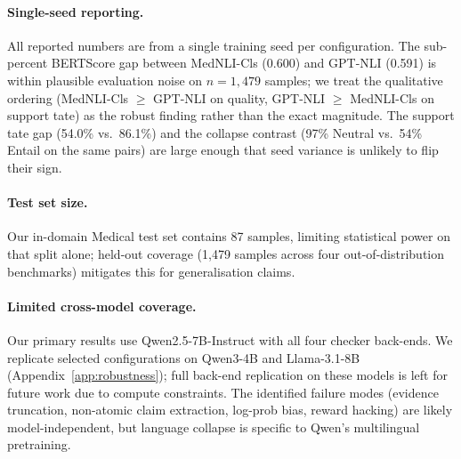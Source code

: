 \documentclass[11pt]{article}
\begin{document}
\paragraph{Single-seed reporting.}
All reported numbers are from a single training seed 
per configuration. The sub-percent BERTScore gap 
between MedNLI-Cls (0.600) and GPT-NLI (0.591) is 
within plausible evaluation noise on $n{=}1{,}479$ 
samples; we treat the qualitative ordering 
(MedNLI-Cls $\geq$ GPT-NLI on quality, 
GPT-NLI $\geq$ MedNLI-Cls on support tate) as the 
robust finding rather than the exact magnitude. The 
support tate gap (54.0\% vs.\ 86.1\%) and the 
collapse contrast (97\% Neutral vs.\ 54\% Entail on 
the same pairs) are large enough that seed variance 
is unlikely to flip their sign.
\paragraph{Test set size.}
Our in-domain Medical test set contains 87 samples,
limiting statistical power on that split alone; 
held-out coverage (1,479 samples across four 
out-of-distribution benchmarks) mitigates this for 
generalisation claims.

\paragraph{Limited cross-model coverage.}
Our primary results use Qwen2.5-7B-Instruct with all 
four checker back-ends. We replicate selected 
configurations on Qwen3-4B and Llama-3.1-8B 
(Appendix~\ref{app:robustness}); full back-end 
replication on these models is left for future work 
due to compute constraints. The identified failure 
modes (evidence truncation, non-atomic claim extraction, 
log-prob bias, reward hacking) are likely 
model-independent, but language collapse is specific 
to Qwen's multilingual pretraining.

\end{document}
